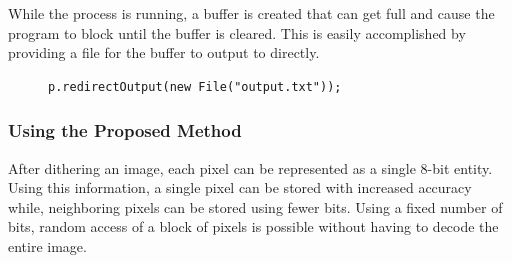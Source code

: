\documentclass[12pt]{CPP}
\begin{document}
While the process is running, a buffer is created that can get full and cause the program to block until the buffer is cleared. This is easily accomplished by providing a file for the buffer to output to directly.

\begin{center}
\begin{figure}[!htbp]
\begin{verbatim}
p.redirectOutput(new File("output.txt"));
\end{verbatim}
\end{figure}
\end{center}

\subsubsection{Using the Proposed Method}
After dithering an image, each pixel can be represented as a single 8-bit entity. Using this information, a single pixel can be stored with increased accuracy while, neighboring pixels can be stored using fewer bits. Using a fixed number of bits, random access of a block of pixels is possible without having to decode the entire image.
\end{document}
